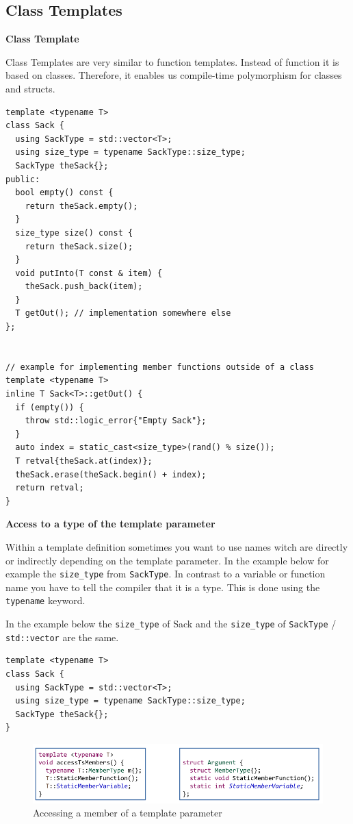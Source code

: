 \documentclass[11pt,twoside,landscape]{article}
\begin{document}
\begin{multicols}{3}
\subsection{Class Templates}
\label{sec:org881013a}
\textbf{Class Template}

Class Templates are very similar to function templates.
Instead of function it is based on classes.
Therefore, it enables us compile-time polymorphism for classes and structs.

\lstset{language=c++,label= ,caption= ,captionpos=b,numbers=none}
\begin{lstlisting}
template <typename T>
class Sack {
  using SackType = std::vector<T>;
  using size_type = typename SackType::size_type;
  SackType theSack{};
public:
  bool empty() const {
    return theSack.empty();
  }
  size_type size() const {
    return theSack.size();
  }
  void putInto(T const & item) {
    theSack.push_back(item);
  }
  T getOut(); // implementation somewhere else
};


// example for implementing member functions outside of a class
template <typename T>
inline T Sack<T>::getOut() {
  if (empty()) {
    throw std::logic_error{"Empty Sack"};
  }
  auto index = static_cast<size_type>(rand() % size());
  T retval{theSack.at(index)};
  theSack.erase(theSack.begin() + index);
  return retval;
}
\end{lstlisting}


\textbf{Access to a type of the template parameter}

Within a template definition sometimes you want to use names witch are directly or indirectly depending on the template parameter.
In the example below for example the \texttt{size\_type} from \texttt{SackType}.
In contrast to a variable or function name you have to tell the compiler that it is a type.
This is done using the \texttt{typename} keyword.

In the example below the \texttt{size\_type} of Sack and the \texttt{size\_type} of \texttt{SackType} / \texttt{std::vector} are the same.

\lstset{language=c++,label= ,caption= ,captionpos=b,numbers=none}
\begin{lstlisting}
template <typename T>
class Sack {
  using SackType = std::vector<T>;
  using size_type = typename SackType::size_type;
  SackType theSack{};
}
\end{lstlisting}


\begin{figure}[htbp]
\centering
\includegraphics[width=.9\linewidth]{img/accessing_member_of_template_parameter.png}
\caption{Accessing a member of a template parameter}
\end{figure}


\end{multicols}
\end{document}
